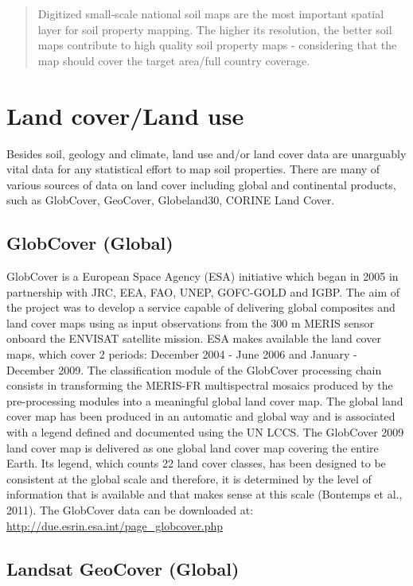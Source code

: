 \documentclass[]{book}
\theoremstyle{definition}
\theoremstyle{definition}
\theoremstyle{definition}
\theoremstyle{remark}
\begin{document}
\begin{quote}
Digitized small-scale national soil maps are the most important spatial
layer for soil property mapping. The higher its resolution, the better
soil maps contribute to high quality soil property maps - considering
that the map should cover the target area/full country coverage.
\end{quote}

\section{Land cover/Land use}\label{land-coverland-use}

Besides soil, geology and climate, land use and/or land cover data are
unarguably vital data for any statistical effort to map soil properties.
There are many of various sources of data on land cover including global
and continental products, such as GlobCover, GeoCover, Globeland30,
CORINE Land Cover.

\subsection{GlobCover (Global)}\label{globcover-global}

GlobCover is a European Space Agency (ESA) initiative which began in
2005 in partnership with JRC, EEA, FAO, UNEP, GOFC-GOLD and IGBP. The
aim of the project was to develop a service capable of delivering global
composites and land cover maps using as input observations from the 300
m MERIS sensor onboard the ENVISAT satellite mission. ESA makes
available the land cover maps, which cover 2 periods: December 2004 -
June 2006 and January - December 2009. The classification module of the
GlobCover processing chain consists in transforming the MERIS-FR
multispectral mosaics produced by the pre-processing modules into a
meaningful global land cover map. The global land cover map has been
produced in an automatic and global way and is associated with a legend
defined and documented using the UN LCCS. The GlobCover 2009 land cover
map is delivered as one global land cover map covering the entire Earth.
Its legend, which counts 22 land cover classes, has been designed to be
consistent at the global scale and therefore, it is determined by the
level of information that is available and that makes sense at this
scale (Bontemps et al., 2011). The GlobCover data can be downloaded at:
\url{http://due.esrin.esa.int/page_globcover.php}

\subsection{Landsat GeoCover (Global)}\label{landsat-geocover-global}
\end{document}
